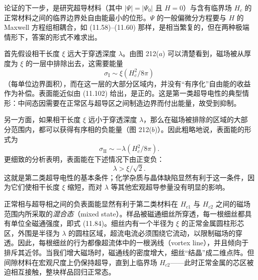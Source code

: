论证的下一步，是研究超导材料（其中 $|\Psi| = |\Psi_0|$ 且 $H = 0$）与含有临界场 $H_c$ 的正常材料之间的临界边界处自由能最小的位形。$\Psi$ 的一般偏微分方程要与 $H$ 的 Maxwell 方程组相耦合，如 (11.58)–(11.60) 那样，是相当繁复的，但在两种极端情形下，答案的形式不难求出。

首先假设相干长度 $\xi$ 远大于穿透深度 $\lambda$。由图 212($a$) 可以清楚看到，磁场被从厚度为 $\xi$ 的一层中排除出去，这需要能量
\begin{equation*}
\sigma_{\mathrm{I}} \sim \xi(H_c^{2}/8\pi)
\tag{11.102}
\end{equation*}
（每单位边界面积），而在这一层的大部分区域内，并没有“有序化”自由能的收益作为补偿。表面能近似由 (11.102) 给出，是正的。这是第一类超导电性的典型情形：中间态因需要在正常区与超导区之间制造边界而付出能量，故受到抑制。

另一方面，如果相干长度 $\xi$ 远小于穿透深度 $\lambda$，那么在磁场被排除的区域的大部分范围内，都可以获得有序相的负能量（图 212($b$)）。因此粗略地说，表面能的形式为
\begin{equation*}
\sigma_{\mathrm{II}} \sim -\lambda(H_c^{2}/8\pi).
\tag{11.103}
\end{equation*}
更细致的分析表明，表面能在下述情况下由正变负：
\begin{equation*}
\lambda > \xi/\sqrt{2}.
\tag{11.104}
\end{equation*}
这就是第二类超导电性的基本条件；化学杂质与晶体缺陷显然有利于这一条件，因为它们使相干长度 $\xi$ 缩短，而对 $\lambda$ 等其他宏观超导参量没有明显的影响。


正常相与超导相之间的负表面能显然有利于第二类材料在 $H_{c1}$ 与 $H_{c2}$ 之间的磁场范围内所采取的\emph{混合态}（mixed state）。样品被磁通细丝所穿透，每一根细丝都具有单位全磁通强度，即式 (11.84)。细丝内有一个半径为 $\xi$ 的正常金属圆柱形芯区，外围是半径为 $\lambda$ 的圆柱区域，超流电流必须围绕它流动，以限制磁场的穿透。因此，每根细丝的行为都像超流体中的一根涡线（vortex line），并且倾向于排斥其近邻。当我们增大磁场时，磁通线的密度增大，细丝“结晶”成二维点阵。但间隙材料在宏观尺度上仍保持超导，直到上临界场 $H_{c2}$——此时正常金属的芯区被迫相互接触，整块样品回归正常态。


